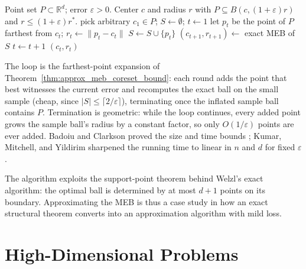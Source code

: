 \begin{algorithm}[htbp]
\caption{Core-Set Based $(1 + \varepsilon)$-Approximate MEB}
\label{alg:approx_meb_coreset}
\begin{algorithmic}[1]
\Require Point set $P \subset \mathbb{R}^d$; error $\varepsilon > 0$.
\Ensure Center $c$ and radius $r$ with $P \subseteq B(c, (1 + \varepsilon) r)$ and $r \leq (1 + \varepsilon) r^*$.
  \State pick arbitrary $c_1 \in P$; $S \gets \emptyset$; $t \gets 1$
    \State let $p_t$ be the point of $P$ farthest from $c_t$; $r_t \gets \|p_t - c_t\|$
    \State $S \gets S \cup \{p_t\}$
    \State $(c_{t+1}, r_{t+1}) \gets$ exact MEB of $S$ 
    \State $t \gets t + 1$
  \EndWhile
  \State \Return $(c_t, r_t)$
\EndFunction
\end{algorithmic}
\end{algorithm}

The loop is the farthest-point expansion of
Theorem~\ref{thm:approx_meb_coreset_bound}: each round adds the point that
best witnesses the current error and recomputes the exact ball on the small
sample (cheap, since $|S| \leq \lceil 2/\varepsilon \rceil$), terminating
once the inflated sample ball contains $P$. Termination is geometric: while
the loop continues, every added point grows the sample ball's radius by a
constant factor, so only $O(1/\varepsilon)$ points are ever added. Badoiu
and Clarkson proved the size and time bounds \cite{badoiu2002}; Kumar,
Mitchell, and Yildirim sharpened the running time to linear in $n$ and $d$
for fixed $\varepsilon$ \cite{kumar2003}.

\begin{remark}
  The algorithm exploits the support-point theorem behind Welzl's exact
  algorithm: the optimal ball is determined by at most $d + 1$ points on its
  boundary. Approximating the MEB is thus a case study in how an exact
  structural theorem converts into an approximation algorithm with mild
  loss.
\end{remark}


\section{High-Dimensional Problems}
\label{sec:approx_high_dimensional}

